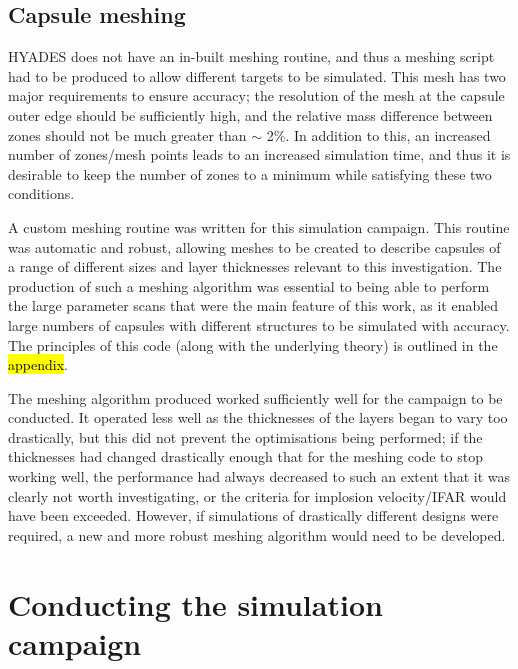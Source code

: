 \subsection{Capsule meshing}

HYADES does not have an in-built meshing routine, and thus a meshing script had to be produced to allow different targets to be simulated. This mesh has two major requirements to ensure accuracy; the resolution of the mesh at the capsule outer edge should be sufficiently high, and the relative mass difference between zones should not be much greater than $\sim$ 2\%. In addition to this, an increased number of zones/mesh points leads to an increased simulation time, and thus it is desirable to keep the number of zones to a minimum while satisfying these two conditions.

A custom meshing routine was written for this simulation campaign. This routine was automatic and robust, allowing meshes to be created to describe capsules of a range of different sizes and layer thicknesses relevant to this investigation. The production of such a meshing algorithm was essential to being able to perform the large parameter scans that were the main feature of this work, as it enabled large numbers of capsules with different structures to be simulated with accuracy. The principles of this code (along with the underlying theory) is outlined in the \hl{appendix}.

The meshing algorithm produced worked sufficiently well for the campaign to be conducted. It operated less well as the thicknesses of the layers began to vary too drastically, but this did not prevent the optimisations being performed; if the thicknesses had changed drastically enough that for the meshing code to stop working well, the performance had always decreased to such an extent that it was clearly not worth investigating, or the criteria for implosion velocity/IFAR would have been exceeded. However, if simulations of drastically different designs were required, a new and more robust meshing algorithm would need to be developed.

\section{Conducting the simulation campaign}


